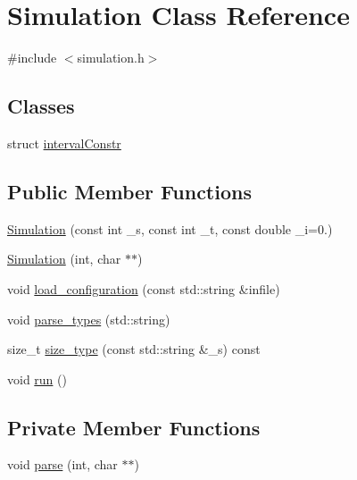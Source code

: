 \hypertarget{classSimulation}{}\section{Simulation Class Reference}
\label{classSimulation}


{\ttfamily \#include $<$simulation.\+h$>$}

\subsection*{Classes}
\begin{DoxyCompactItemize}
\item 
struct \hyperlink{structSimulation_1_1intervalConstr}{interval\+Constr}
\end{DoxyCompactItemize}
\subsection*{Public Member Functions}
\begin{DoxyCompactItemize}
\item 
\hyperlink{classSimulation_a26f2ed7943035d802b1b2182ba04af12}{Simulation} (const int \+\_\+s, const int \+\_\+t, const double \+\_\+i=0.)
\item 
\hyperlink{classSimulation_a2cc0f2dc7164778a64462d8b9ec5206d}{Simulation} (int, char $\ast$$\ast$)
\item 
void \hyperlink{classSimulation_acd6ce915b07465d9aaaa5fdcbb5ae077}{load\+\_\+configuration} (const std\+::string \&infile)
\item 
void \hyperlink{classSimulation_afc095e76c2bcee6d31a4614022d609c3}{parse\+\_\+types} (std\+::string)
\item 
size\+\_\+t \hyperlink{classSimulation_a7d0ca858dfec187001ecbab2081f9d04}{size\+\_\+type} (const std\+::string \&\+\_\+s) const
\item 
void \hyperlink{classSimulation_ae5c367f87c0b5dc9740bc6d00e44e72c}{run} ()
\end{DoxyCompactItemize}
\subsection*{Private Member Functions}
\begin{DoxyCompactItemize}
\item 
void \hyperlink{classSimulation_a8f71691f59f56fcb86fa49281c2841db}{parse} (int, char $\ast$$\ast$)
\end{DoxyCompactItemize}
